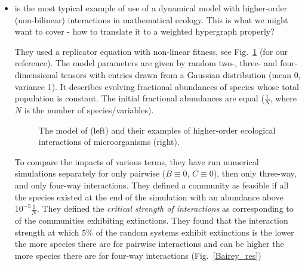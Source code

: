 \begin{itemize}


    \item \cite{Bairey2016} is the most typical example of use of a dynamical model with higher-order (non-bilinear) interactions in mathematical ecology. This is what we might want to cover - how to translate it to a weighted hypergraph properly?
    
    They used a replicator equation with non-linear fitness, see Fig.~\ref{Bairey_eq_ex} (for our reference). The model parameters are given by random two-, three- and four-dimensional tensors with entries drawn from a Gaussian distribution (mean 0, variance 1). It describes evolving fractional abundances of species whose total population is constant. The initial fractional abundances are equal ($\tfrac{1}{N}$, where $N$ is the number of species/variables).
    \begin{figure}[h!]
	\begin{center}
        \caption{The model of \cite{Bairey2016} (left) and their examples of higher-order ecological interactions of microorganisms (right).} 
    	\label{Bairey_eq_ex}
    \end{center}
    \end{figure}
    To compare the impacts of various terms, they have run numerical simulations separately for only pairwise ($B\equiv 0$, $C\equiv 0$), then only three-way, and only four-way interactions.
    They defined a community as feasible if all the species existed at the end of the simulation with an abundance above $10^{-5}\tfrac{1}{N}$. They defined the \emph{critical strength of interactions} as corresponding to  of the communities exhibiting extinctions. 
    They found that the interaction strength at which $5\%$ of the random systems exhibit extinctions is the lower the more species there are for pairwise interactions and can be higher the more species there are for four-way interactions (Fig.~\ref{Bairey_res})


\end{itemize}
